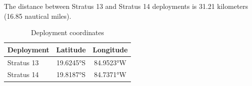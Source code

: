 
The distance between Stratus 13 and Stratus 14 deployments is 31.21 kilometers (16.85 nautical miles).

\begin{table}[ht]
\centering
\caption{Deployment coordinates}
\begin{tabular}{lcc}
\hline
\textbf{Deployment} & \textbf{Latitude} & \textbf{Longitude} \\
\hline
Stratus 13 & 19.6245°S & 84.9523°W \\
Stratus 14 & 19.8187°S & 84.7371°W \\
\hline
\end{tabular}
\end{table}
